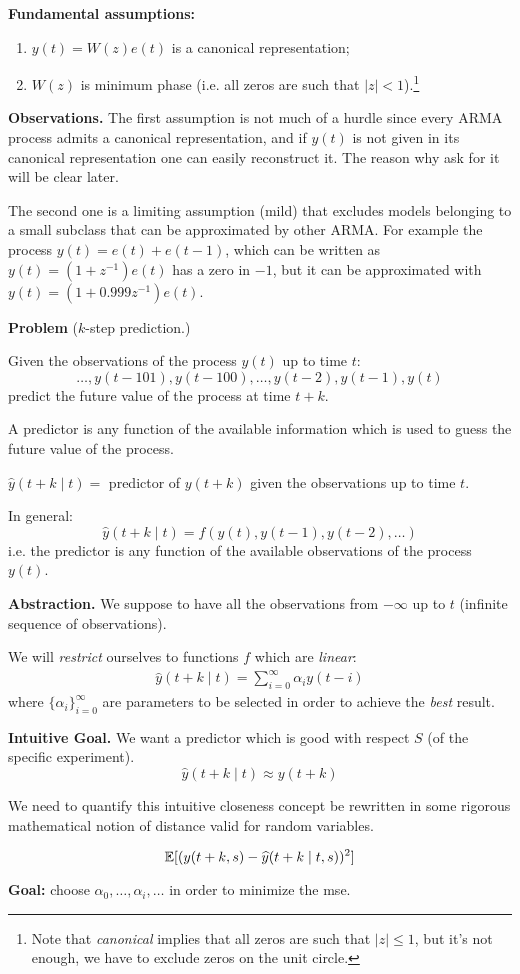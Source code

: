 \textbf{Fundamental assumptions:}\label{assumptions-prediction-theory}
\begin{enumerate}
	\item $y(t) = W(z)e(t)$ is a canonical representation;
	\item $W(z)$ is minimum phase (i.e. all zeros are such that $|z|<1$).\footnote{Note that \emph{canonical} implies that all zeros are such that $|z|\leq 1$, but it's not enough, we have to exclude zeros on the unit circle.}
\end{enumerate}
 
\textbf{Observations.}
The first assumption is not much of a hurdle since every ARMA process admits a canonical representation, and if $y(t)$ is not given in its canonical representation one can easily reconstruct it. The reason why ask for it will be clear later. 

The second one is a limiting assumption (mild) that excludes models belonging to a small subclass that can be approximated by other ARMA. For example the process $y(t)=e(t)+e(t-1)$, which can be written as $y(t)=(1+z^{-1})e(t)$ has a zero in $-1$, but it can be approximated with $y(t)=(1+0.999z^{-1})e(t)$.

\textbf{Problem} ($k$-step prediction.)

Given the observations of the process $y(t)$ up to time $t$:
$$
	\ldots , y(t-101), y(t-100), \ldots , y(t-2), y(t-1), y(t)
$$
predict the future value of the process at time $t + k$.


A predictor is any function of the available information which is used to guess the future value of the process.

$\hat{y}(t + k \mid t) =$ predictor of $y(t + k)$ given the observations up to time $t$.

In general: 
$$\hat{y}(t + k \mid t) = f ( y(t), y(t-1), y(t-2),\ldots)$$
i.e. the predictor is any function of the available observations of the process $y(t)$.

\textbf{Abstraction.} We suppose to have all the observations from $-\infty$ up to $t$ (infinite sequence of observations).

We will \emph{restrict} ourselves to functions $f$ which are \emph{linear}:
\begin{align*}
	\hat{y}(t + k \mid t)=\sum_{i=0}^{\infty}\alpha_i y(t-i)
\end{align*}
where ${\{\alpha_i\}}_{i=0}^\infty$ are parameters to be selected in order to achieve the \emph{best} result.

\textbf{Intuitive Goal.} 
We want a predictor which is good with respect $S$ (of the specific experiment).
\[
	\hat{y}(t + k \mid t)\approx y(t+k)
\]

We need to quantify this intuitive closeness concept be rewritten in some rigorous mathematical notion of distance valid for random variables.

\begin{definition}
	\[
		\mathbb{E}[(y(t+k,s)-\widehat{y}(t+k\mid t,s))^2]
	\]
\end{definition}

\textbf{Goal:} choose $\alpha_0,\ldots,\alpha_i,\ldots$ in order to minimize the \gls{mse}.